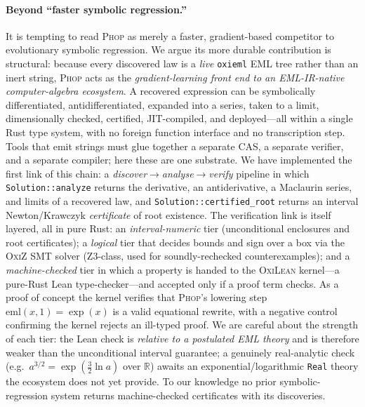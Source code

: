 \documentclass{article}
\begin{document}
\paragraph{Beyond ``faster symbolic regression.''}
It is tempting to read \textsc{Phop} as merely a faster, gradient-based
competitor to evolutionary symbolic regression. We argue its more
durable contribution is structural: because every discovered law is a
\emph{live} \texttt{oxieml} EML tree rather than an inert string,
\textsc{Phop} acts as the \emph{gradient-learning front end to an
EML-IR-native computer-algebra ecosystem}. A recovered expression can
be symbolically differentiated, antidifferentiated, expanded into a
series, taken to a limit, dimensionally checked, certified, JIT-compiled,
and deployed---all within a single Rust type system, with no foreign
function interface and no transcription step. Tools that emit strings
must glue together a separate CAS, a separate verifier, and a separate
compiler; here these are one substrate. We have implemented the first
link of this chain: a \emph{discover$\rightarrow$analyse$\rightarrow$verify}
pipeline in which \texttt{Solution::analyze} returns the derivative,
an antiderivative, a Maclaurin series, and limits of a recovered law,
and \texttt{Solution::certified\_root} returns an interval
Newton/Krawczyk \emph{certificate} of root existence. The verification
link is itself layered, all in pure Rust: an \emph{interval-numeric} tier
(unconditional enclosures and root certificates); a \emph{logical} tier
that decides bounds and sign over a box via the \textsc{OxiZ} SMT solver
(Z3-class, used for soundly-rechecked counterexamples); and a
\emph{machine-checked} tier in which a property is handed to the
\textsc{OxiLean} kernel---a pure-Rust Lean type-checker---and accepted only
if a proof term checks. As a proof of concept the kernel verifies that
\textsc{Phop}'s lowering step $\mathrm{eml}(x,1)=\exp(x)$ is a valid
equational rewrite, with a negative control confirming the kernel rejects
an ill-typed proof. We are careful about the strength of each tier: the
Lean check is \emph{relative to a postulated EML theory} and is therefore
weaker than the unconditional interval guarantee; a genuinely
real-analytic check (e.g.\ $a^{3/2}=\exp(\tfrac32\ln a)$ over $\mathbb{R}$)
awaits an exponential/logarithmic \texttt{Real} theory the ecosystem does
not yet provide. To our knowledge no prior symbolic-regression system
returns machine-checked certificates with its discoveries.
\end{document}
